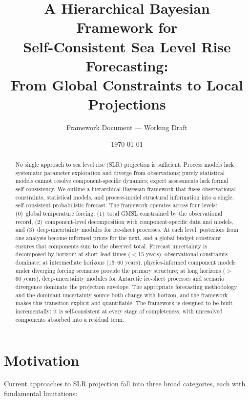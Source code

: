 \documentclass[11pt]{article}
\title{A Hierarchical Bayesian Framework for\\
  Self-Consistent Sea Level Rise Forecasting:\\
  From Global Constraints to Local Projections}
\author{Framework Document — Working Draft}
\date{\today}
\begin{document}
\maketitle

\begin{abstract}
No single approach to sea level rise (SLR) projection is sufficient.  Process models lack systematic parameter exploration and diverge from observations; purely statistical models cannot resolve component-specific dynamics; expert assessments lack formal self-consistency.  We outline a hierarchical Bayesian framework that fuses observational constraints, statistical models, and process-model structural information into a single, self-consistent probabilistic forecast.  The framework operates across four levels: (0)~global temperature forcing, (1)~total GMSL constrained by the observational record, (2)~component-level decomposition with component-specific data and models, and (3)~deep-uncertainty modules for ice-sheet processes.  At each level, posteriors from one analysis become informed priors for the next, and a global budget constraint ensures that components sum to the observed total.  Forecast uncertainty is decomposed by horizon: at short lead times ($<$15 years), observational constraints dominate; at intermediate horizons (15--60 years), physics-informed component models under diverging forcing scenarios provide the primary structure; at long horizons ($>$60 years), deep-uncertainty modules for Antarctic ice-sheet processes and scenario divergence dominate the projection envelope.  The appropriate forecasting methodology and the dominant uncertainty source both change with horizon, and the framework makes this transition explicit and quantifiable.  The framework is designed to be built incrementally: it is self-consistent at every stage of completeness, with unresolved components absorbed into a residual term.
\end{abstract}


\section{Motivation}

Current approaches to SLR projection fall into three broad categories, each with fundamental limitations:
\end{document}
